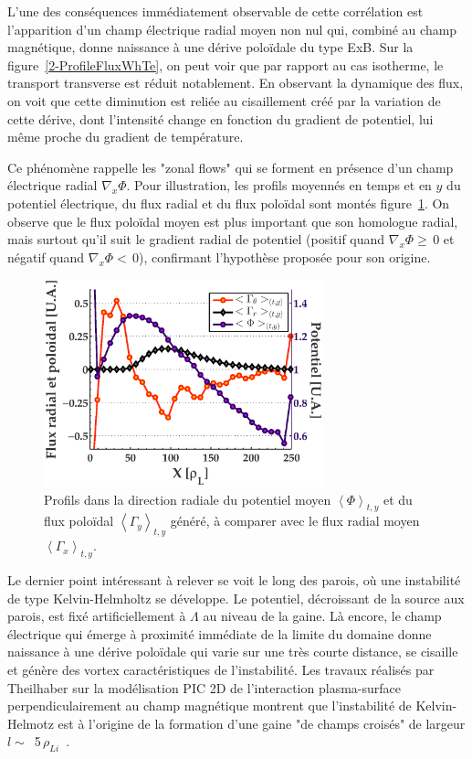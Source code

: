 \begin{refsection}
L'une des conséquences immédiatement observable de cette corrélation est
l'apparition d'un champ électrique radial moyen non nul qui, combiné au champ
magnétique, donne naissance à une dérive poloïdale du type ExB. Sur la
figure~\ref{2-ProfileFluxWhTe}, on peut voir que par rapport au cas isotherme,
le transport transverse est réduit notablement. En observant la dynamique
des flux, on voit que cette diminution est reliée au cisaillement créé par la
variation de cette dérive, dont l'intensité change en fonction du gradient de
potentiel, lui même proche du gradient de température.

Ce phénomène rappelle les "zonal flows" qui se forment en présence
d'un champ électrique radial $\nabla_x{\Phi}$. Pour illustration, les profils
moyennés en temps et en $y$ du potentiel électrique, du flux radial et du
flux poloïdal sont montés figure~\ref{2-profileFluxRadialWhTedNdx}. On observe
que le flux poloïdal moyen est plus important que son homologue radial, mais
surtout qu'il suit le gradient radial de potentiel (positif quand
$\nabla_x\Phi\ge\,$0 et négatif quand $\nabla_x\Phi<\,$0), confirmant
l'hypothèse proposée pour son origine.

	\begin{figure}[!htbp]
    \centering
    \includegraphics[height=6cm]{figures/2-profileFluxWhTedNdx.eps}
    \caption{Profils dans la direction radiale du potentiel moyen
    $\left<\Phi\right>_{t,y}$ et du flux poloïdal $\left<\Gamma_y\right>_{t,y}$
    généré, à comparer avec le flux radial moyen
    $\left<\Gamma_x\right>_{t,y}$.\label{2-profileFluxRadialWhTedNdx}}
	\end{figure}

Le dernier point intéressant à relever se voit le long des parois, où une
instabilité de type Kelvin-Helmholtz se développe. Le potentiel, décroissant de
la source aux parois, est fixé artificiellement à $\Lambda$ au niveau de la gaine.
Là encore, le champ électrique qui émerge à proximité immédiate de la limite du
domaine donne naissance à une dérive poloïdale qui varie sur une très courte
distance, se cisaille et génère des vortex caractéristiques de l'instabilité.
Les travaux réalisés par Theilhaber sur la modélisation PIC 2D de l'interaction
plasma-surface perpendiculairement au champ magnétique
 montrent que l'instabilité de Kelvin-Helmotz est à
l'origine de la formation d'une gaine "de champs croisés" de largeur $l\sim\,$
5$\,\rho_{Li}$~\parencite{Theilhaber}.


\end{refsection}
